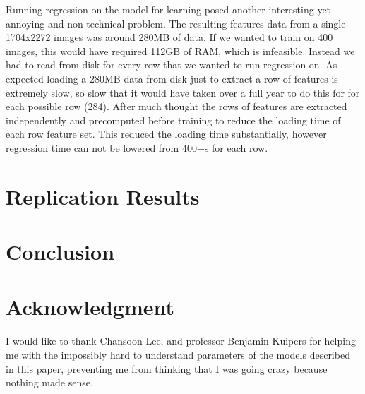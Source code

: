 \documentclass[journal]{IEEEtran}
\begin{document}
Running regression on the model for learning posed another interesting yet annoying and non-technical problem. The resulting features data from a single 1704x2272 images was around 280MB of data. If we wanted to train on 400 images, this would have required 112GB of RAM, which is infeasible. Instead we had to read from disk for every row that we wanted to run regression on. As expected loading a 280MB data from disk just to extract a row of features is extremely slow, so slow that it would have taken over a full year to do this for for each possible row (284). After much thought the rows of features are extracted independently and precomputed before training to reduce the loading time of each row feature set. This reduced the loading time substantially, however regression time can not be lowered from 400+s for each row.

\section{Replication Results}

\section{Conclusion}

\section*{Acknowledgment}
I would like to thank Chansoon Lee, and professor Benjamin Kuipers for helping me with the impossibly hard to understand parameters of the models described in this paper, preventing me from thinking that I was going crazy because nothing made sense.



\end{document}
